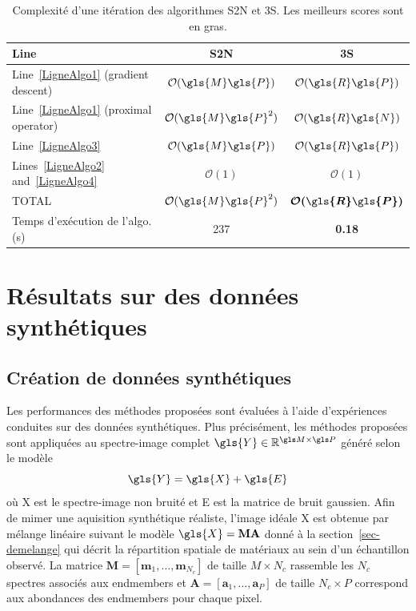 \begin{table}[h!]
    \centering
    \bgroup
    \def\arraystretch{1.5}
    \begin{tabular}{b{5cm}cc}
        \toprule
        Line&S2N&3S\\
        \midrule
        Line~\ref{LigneAlgo1} (gradient descent)        &$\mathcal{O}(\gls{M}\gls{P})$      &$\mathcal{O}(\gls{R} \gls{P})$\\
        Line~\ref{LigneAlgo1} (proximal operator)       &$\mathcal{O}(\gls{M}\gls{P}^2)$    &$\mathcal{O}(\gls{R} \gls{N})$\\
        Line~\ref{LigneAlgo3}                           &$\mathcal{O}(\gls{M}\gls{P})$      &$\mathcal{O}(\gls{R}\gls{P})$\\
        Lines~\ref{LigneAlgo2} and~\ref{LigneAlgo4}     &$\mathcal{O}(1)$           &$\mathcal{O}(1)$\\
        TOTAL&$\mathcal{O}(\gls{M}\gls{P}^2)$    &$\boldsymbol{\mathcal{O}(\gls{R} \gls{P})}$\\
        \bottomrule
        Temps d'exécution de l'algo. (s)&237&\textbf{0.18}\\
        \bottomrule
    \end{tabular}
    \egroup
    \caption{Complexité d'une itération des algorithmes S2N et 3S. Les meilleurs scores sont en gras.
        \protect\label{table-ComplexitySummary}}
\end{table} 

%
\section{Résultats sur des données synthétiques}

\subsection{Création de données synthétiques}\label{sec-synth-data-lr}

Les performances des méthodes proposées sont évaluées à l'aide d'expériences conduites sur des données synthétiques. Plus précisément, les méthodes proposées sont appliquées au spectre-image complet $\gls{Y}\in\mathbb{R}^{\taille{M}{P}}$ généré selon le modèle
\begin{equation}
    \gls{Y} = \gls{X} + \gls{E}
\end{equation}
où \gls{X} est le spectre-image non bruité et \gls{E} est la matrice de bruit gaussien.
Afin de mimer une aquisition synthétique réaliste, l'image idéale \gls{X} est obtenue par mélange linéaire suivant le modèle $\gls{X} = \mathbf{M}\mathbf{A}$ donné à la section~\ref{sec-demelange} qui décrit la répartition spatiale de matériaux au sein d'un échantillon observé. La matrice $\mathbf{M}=[\mathbf{m}_1, \dots, \mathbf{m}_{N_c}]$ de taille $M\times N_c$ rassemble les $N_c$ spectres associés aux endmembers et $\mathbf{A} = [\mathbf{a}_1, \dots, \mathbf{a}_P]$ de taille $N_c\times P$ correspond aux abondances des endmembers pour chaque pixel.

